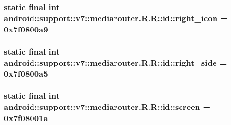 \hypertarget{classandroid_1_1support_1_1v7_1_1mediarouter_1_1_r_1_1id_a3632596b1ae9ea99e0483e52d6cc229}{
\subsubsection[{right\_\-icon}]{\setlength{\rightskip}{0pt plus 5cm}static final int android::support::v7::mediarouter.R.R::id::right\_\-icon = 0x7f0800a9}}
\label{classandroid_1_1support_1_1v7_1_1mediarouter_1_1_r_1_1id_a3632596b1ae9ea99e0483e52d6cc229}


\hypertarget{classandroid_1_1support_1_1v7_1_1mediarouter_1_1_r_1_1id_8796fd233270d24e7631aacc6b0c7b42}{
\subsubsection[{right\_\-side}]{\setlength{\rightskip}{0pt plus 5cm}static final int android::support::v7::mediarouter.R.R::id::right\_\-side = 0x7f0800a5}}
\label{classandroid_1_1support_1_1v7_1_1mediarouter_1_1_r_1_1id_8796fd233270d24e7631aacc6b0c7b42}


\hypertarget{classandroid_1_1support_1_1v7_1_1mediarouter_1_1_r_1_1id_eb30ae39bdee42021a6ccc4ceee72e62}{
\subsubsection[{screen}]{\setlength{\rightskip}{0pt plus 5cm}static final int android::support::v7::mediarouter.R.R::id::screen = 0x7f08001a}}
\label{classandroid_1_1support_1_1v7_1_1mediarouter_1_1_r_1_1id_eb30ae39bdee42021a6ccc4ceee72e62}


